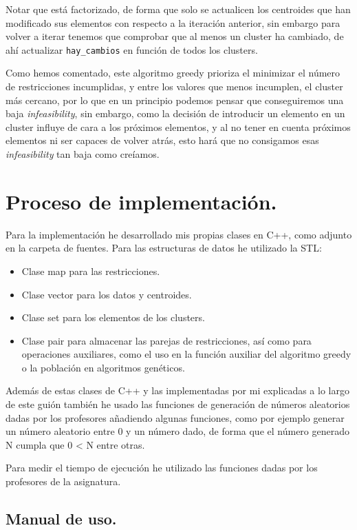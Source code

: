 \documentclass[12pt, spanish]{article}
\begin{document}
Notar que está factorizado, de forma que solo se actualicen los centroides que han modificado sus elementos con respecto a la iteración anterior, sin embargo para volver a iterar tenemos que comprobar que al menos un cluster ha cambiado, de ahí actualizar \texttt{hay\_cambios} en función de todos los clusters.

Como hemos comentado, este algoritmo greedy prioriza el minimizar el número de restricciones incumplidas, y entre los valores que menos incumplen, el cluster más cercano, por lo que en un principio podemos pensar que conseguiremos una baja \textit{infeasibility}, sin embargo, como la decisión de introducir un elemento en un cluster influye de cara a los próximos elementos, y al no tener en cuenta próximos elementos ni ser capaces de volver atrás, esto hará que no consigamos esas \textit{infeasibility} tan baja como creíamos.

\section{Proceso de implementación.}

Para la implementación he desarrollado mis propias clases en C++, como adjunto en la carpeta de fuentes. Para las estructuras de datos he utilizado la STL:

\begin{itemize}
	\item Clase map para las restricciones.
	\item Clase vector para los datos y centroides.
	\item Clase set para los elementos de los clusters.
	\item Clase pair para almacenar las parejas de restricciones, así como para operaciones auxiliares, como el uso en la función auxiliar del algoritmo greedy o la población en algoritmos genéticos.
\end{itemize}

Además de estas clases de C++ y las implementadas por mi explicadas a lo largo de este guión también he usado las funciones de generación de números aleatorios dadas por los profesores añadiendo algunas funciones, como por ejemplo generar un número aleatorio entre 0 y un número dado, de forma que el número generado N cumpla que 0 < N entre otras.

Para medir el tiempo de ejecución he utilizado las funciones dadas por los profesores de la asignatura.


\subsection{Manual de uso.}
\end{document}
